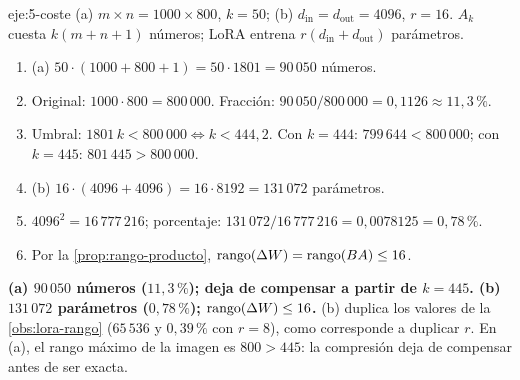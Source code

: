 \begin{solucion}{eje:5-coste}
\datos (a) $m\times n=1000\times 800$, $k=50$; (b) $d_{\text{in}}=d_{\text{out}}=4096$, $r=16$.
\planteamiento $A_k$ cuesta $k(m+n+1)$ números; LoRA entrena $r(d_{\text{in}}+d_{\text{out}})$ parámetros.
\pasos
\begin{enumerate}[label=\arabic*.]
  \item (a) $50\cdot(1000+800+1)=50\cdot 1801=90\,050$ números.
  \item Original: $1000\cdot 800=800\,000$. Fracción: $90\,050/800\,000=0{,}1126\approx 11{,}3\,\%$.
  \item Umbral: $1801\,k<800\,000\iff k<444{,}2$. Con $k=444$: $799\,644<800\,000$; con $k=445$: $801\,445>800\,000$.
  \item (b) $16\cdot(4096+4096)=16\cdot 8192=131\,072$ parámetros.
  \item $4096^{2}=16\,777\,216$; porcentaje: $131\,072/16\,777\,216=0{,}0078125=0{,}78\,\%$.
  \item Por la \cref{prop:rango-producto}, $\operatorname{rango}(\Delta W)=\operatorname{rango}(BA)\le 16$.
\end{enumerate}
\resultado \textbf{(a) $90\,050$ números ($11{,}3\,\%$); deja de compensar a partir de $k=445$. (b) $131\,072$ parámetros ($0{,}78\,\%$); $\operatorname{rango}(\Delta W)\le 16$.}
\comprobacion (b) duplica los valores de la \cref{obs:lora-rango} ($65\,536$ y $0{,}39\,\%$ con $r=8$), como corresponde a duplicar $r$. En (a), el rango máximo de la imagen es $800>445$: la compresión deja de compensar antes de ser exacta.
\end{solucion}

